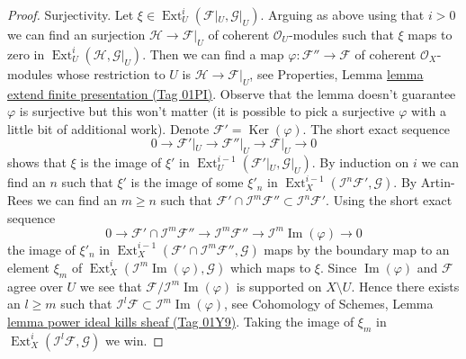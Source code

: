 \documentclass{amsart}
\theoremstyle{plain}
\theoremstyle{definition}
\theoremstyle{remark}
\numberwithin{equation}{subsection}
\def\Ext{\mathop{\mathrm{Ext}}\nolimits}
\def\Ker{\mathop{\mathrm{Ker}}}
\def\Im{\mathop{\mathrm{Im}}}
\begin{document}
\begin{proof}
\medskip\noindent
Surjectivity. Let $\xi \in \Ext^i_U(\mathcal{F}|_U, \mathcal{G}|_U)$.
Arguing as above using that $i > 0$ we can find an surjection
$\mathcal{H} \to \mathcal{F}|_U$ of coherent $\mathcal{O}_U$-modules
such that $\xi$ maps to zero in $\Ext^i_U(\mathcal{H}, \mathcal{G}|_U)$.
Then we can find a map $\varphi : \mathcal{F}'' \to \mathcal{F}$
of coherent $\mathcal{O}_X$-modules whose restriction to $U$ is
$\mathcal{H} \to \mathcal{F}|_U$, see
Properties, Lemma \href{https://stacks.math.columbia.edu/tag/01PI}{lemma extend finite presentation (Tag 01PI)}.
Observe that the lemma doesn't guarantee $\varphi$ is surjective
but this won't matter (it is possible to pick a surjective $\varphi$
with a little bit of additional work).
Denote $\mathcal{F}' = \Ker(\varphi)$. The short exact sequence
$$
0 \to \mathcal{F}'|_U \to \mathcal{F}''|_U \to \mathcal{F}|_U \to 0
$$
shows that $\xi$ is the image of $\xi'$ in
$\Ext^{i - 1}_U(\mathcal{F}'|_U, \mathcal{G}|_U)$.
By induction on $i$ we can find an $n$ such that
$\xi'$ is the image of some $\xi'_n$ in
$\Ext^{i - 1}_X(\mathcal{I}^n\mathcal{F}', \mathcal{G})$.
By Artin-Rees we can find an $m \geq n$ such that
$\mathcal{F}' \cap \mathcal{I}^m\mathcal{F}'' \subset
\mathcal{I}^n\mathcal{F}'$. Using the short exact sequence
$$
0 \to \mathcal{F}' \cap \mathcal{I}^m\mathcal{F}'' \to
\mathcal{I}^m\mathcal{F}'' \to \mathcal{I}^m\Im(\varphi) \to 0
$$
the image of $\xi'_n$ in
$\Ext^{i - 1}_X(\mathcal{F}' \cap \mathcal{I}^m\mathcal{F}'', \mathcal{G})$
maps by the boundary map to an element $\xi_m$ of
$\Ext^i_X(\mathcal{I}^m\Im(\varphi), \mathcal{G})$ which maps
to $\xi$. Since $\Im(\varphi)$ and $\mathcal{F}$ agree over $U$
we see that $\mathcal{F}/\mathcal{I}^m\Im(\varphi)$ is supported
on $X \setminus U$. Hence there exists an $l \geq m$
such that $\mathcal{I}^l\mathcal{F} \subset \mathcal{I}^m\Im(\varphi)$, see
Cohomology of Schemes, Lemma \href{https://stacks.math.columbia.edu/tag/01Y9}{lemma power ideal kills sheaf (Tag 01Y9)}.
Taking the image of $\xi_m$ in
$\Ext^i_X(\mathcal{I}^l\mathcal{F}, \mathcal{G})$ we win.
\end{proof}
\end{document}
